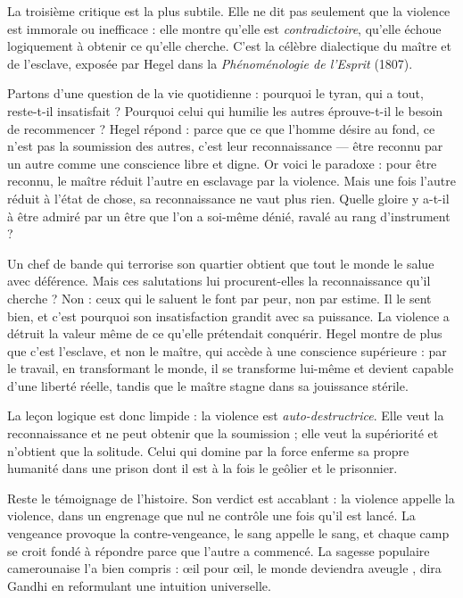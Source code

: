 \documentclass[11pt]{article}
\newcommand{\cle}[1]{{\popxbold\color{popdark}#1}}
\newcounter{popsec}
\newcounter{popsub}
\newcommand{\courssub}[1]{%
  \stepcounter{popsub}%
  \par\vspace{9pt}\noindent{\popxbold\fontsize{11.5}{13}\selectfont\color{popink}{\color{poporange}\thepopsec.\thepopsub}\hspace{6pt}#1}\par\nopagebreak\vspace{4pt}
}
\begin{document}
La troisième critique est la plus subtile. Elle ne dit pas seulement que la violence est immorale ou inefficace : elle montre qu'elle est \emph{contradictoire}, qu'elle échoue logiquement à obtenir ce qu'elle cherche. C'est la célèbre dialectique du \cle{maître} et de l'\cle{esclave}, exposée par Hegel dans la \emph{Phénoménologie de l'Esprit} (1807).

Partons d'une question de la vie quotidienne : pourquoi le tyran, qui a tout, reste-t-il insatisfait ? Pourquoi celui qui humilie les autres éprouve-t-il le besoin de recommencer ? Hegel répond : parce que ce que l'homme désire au fond, ce n'est pas la soumission des autres, c'est leur \cle{reconnaissance} — être reconnu par un autre comme une conscience libre et digne. Or voici le paradoxe : pour être reconnu, le maître réduit l'autre en esclavage par la violence. Mais une fois l'autre réduit à l'état de chose, sa reconnaissance ne vaut plus rien. Quelle gloire y a-t-il à être admiré par un être que l'on a soi-même dénié, ravalé au rang d'instrument ?

\begin{exemplebox}
Un chef de bande qui terrorise son quartier obtient que tout le monde le salue avec déférence. Mais ces salutations lui procurent-elles la reconnaissance qu'il cherche ? Non : ceux qui le saluent le font par peur, non par estime. Il le sent bien, et c'est pourquoi son insatisfaction grandit avec sa puissance. La violence a détruit la valeur même de ce qu'elle prétendait conquérir. Hegel montre de plus que c'est l'esclave, et non le maître, qui accède à une conscience supérieure : par le travail, en transformant le monde, il se transforme lui-même et devient capable d'une liberté réelle, tandis que le maître stagne dans sa jouissance stérile.
\end{exemplebox}

La leçon logique est donc limpide : la violence est \emph{auto-destructrice}. Elle veut la reconnaissance et ne peut obtenir que la soumission ; elle veut la supériorité et n'obtient que la solitude. Celui qui domine par la force enferme sa propre humanité dans une prison dont il est à la fois le geôlier et le prisonnier.

\courssub{La critique historique : l'engrenage de la violence}

Reste le témoignage de l'histoire. Son verdict est accablant : la violence appelle la violence, dans un engrenage que nul ne contrôle une fois qu'il est lancé. La vengeance provoque la contre-vengeance, le sang appelle le sang, et chaque camp se croit fondé à répondre parce que l'autre a commencé. La sagesse populaire camerounaise l'a bien compris : \guillemotleft œil pour œil, le monde deviendra aveugle \guillemotright, dira Gandhi en reformulant une intuition universelle.
\end{document}
